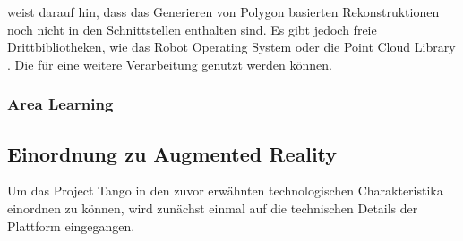 \citet{GoogleDevelopersConcepts:online} weist darauf hin, dass das Generieren von Polygon basierten Rekonstruktionen noch nicht in den Schnittstellen enthalten sind. Es gibt jedoch freie Drittbibliotheken, wie das Robot Operating System \citep{ROS} oder die Point Cloud Library \citep{pcl}. Die für eine weitere Verarbeitung genutzt werden können.

\subsubsection{Area Learning} \label{subsec:area-learning}


\subsection{Einordnung zu Augmented Reality}

Um das Project Tango in den zuvor erwähnten technologischen Charakteristika einordnen zu können, wird zunächst einmal auf die technischen Details der Plattform eingegangen. \\
